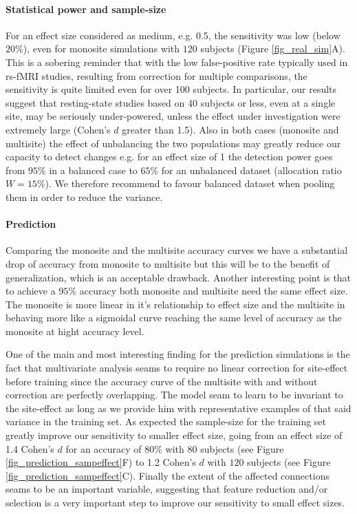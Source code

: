 \documentclass[authoryear]{elsarticle}
\begin{document}
\paragraph{Statistical power and sample-size} For an effect size considered as medium, e.g. 0.5, the sensitivity was low (below $20\%$), even for monosite simulations with $120$ subjects (Figure \ref{fig_real_sim}A). This is a sobering reminder that with the low false-positive rate typically used in rs-fMRI studies, resulting from correction for multiple comparisons, the sensitivity is quite limited even for over 100 subjects. In particular, our results suggest that resting-state studies based on 40 subjects or less, even at a single site, may be seriously under-powered, unless the effect under investigation were extremely large (Cohen's $d$ greater than 1.5). Also in both cases (monosite and multisite) the effect of unbalancing the two populations may greatly reduce our capacity to detect changes e.g. for an effect size of 1 the detection power goes from $95\%$ in a balanced case to $65\%$ for an unbalanced dataset (allocation ratio $W=15\%$). We therefore recommend to favour balanced dataset when pooling them in order to reduce the variance.

\paragraph{Prediction}
Comparing the monosite and the multisite accuracy curves we have a substantial drop of accuracy from monosite to multisite but this will be to the benefit of generalization, which is an acceptable drawback. Another interesting point is that to achieve a $95\%$ accuracy both monosite and multisite need the same effect size. The monosite is more linear in it's relationship to effect size and the multisite in behaving more like a sigmoidal curve reaching the same level of accuracy as the monosite at hight accuracy level.

One of the main and most interesting finding for the prediction simulations is the fact that multivariate analysis seams to require no linear correction for site-effect before training since the accuracy curve of the multisite with and without correction are perfectly overlapping. The model seam to learn to be invariant to the site-effect as long as we provide him with representative examples of that said variance in the training set. As expected the sample-size for the training set greatly improve our sensitivity to smaller effect size, going from an effect size of 1.4 Cohen's $d$ for an accuracy of $80\%$ with $80$ subjects (see Figure \ref{fig_prediction_sampeffect}F) to 1.2 Cohen's $d$ with $120$ subjects (see Figure \ref{fig_prediction_sampeffect}C). Finally the extent of the affected connections seams to be an important variable, suggesting that feature reduction and/or selection is a very important step to improve our sensitivity to small effect sizes.
\end{document}
